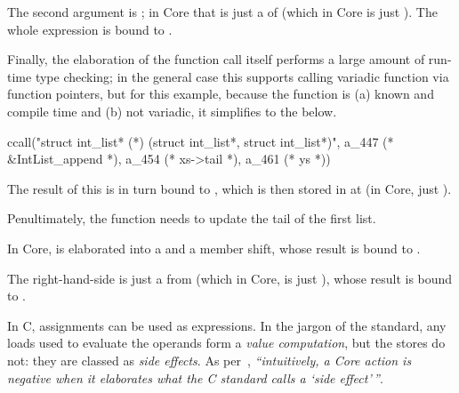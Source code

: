 The second argument is ; in Core that is just a  %
of  (which in Core is just ). The whole expression
is bound to .


Finally, the elaboration of the function call itself performs a large amount of
run-time type checking; in the general case this supports calling variadic
function via function pointers, but for this example, because the function is
(a) known and compile time and (b) not variadic, it simplifies to the below.

\begin{corecode}
ccall("struct int_list* (*) (struct int_list*, struct int_list*)",
      a_447 (* &IntList_append *),
      a_454 (* xs->tail *),
      a_461 (* ys *))
\end{corecode}

The result of this is in turn bound to , which is then
stored in at  (in Core, just ).


Penultimately, the  function needs to update the tail
of the first list.


In Core,  is elaborated into a  %
and a member shift, whose result is bound to .


The right-hand-side is just a  from  %
(which in Core, is just ), whose result is bound to
.


In C, assignments can be used as expressions. In the jargon of the standard,
any loads used to evaluate the operands form a \emph{value computation}, but
the stores do not: they are classed as \emph{side effects}. As
per~\textcite[p61, p66, p99]{memarian2022cerberus}, \emph{``intuitively, a Core action
is negative when it elaborates what the C standard calls a `side
effect'\,''}.

